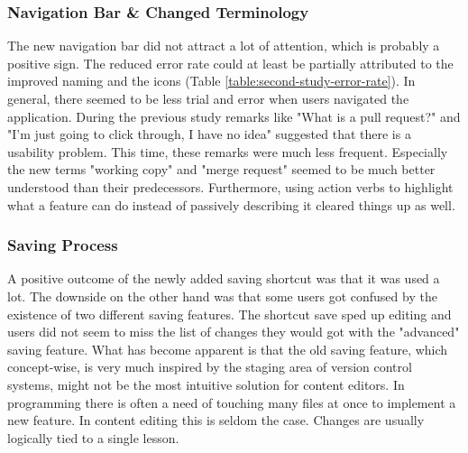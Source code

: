 \subsubsection{Navigation Bar \& Changed Terminology}
The new navigation bar did not attract a lot of attention, which is probably a positive sign. The reduced error rate could at least be partially attributed to the improved naming and the icons (Table \ref{table:second-study-error-rate}). In general, there seemed to be less trial and error when users navigated the application. During the previous study remarks like "What is a pull request?" and "I'm just going to click through, I have no idea" suggested that there is a usability problem. This time, these remarks were much less frequent. Especially the new terms "working copy" and "merge request" seemed to be much better understood than their predecessors. Furthermore, using action verbs to highlight what a feature can do instead of passively describing it cleared things up as well.



\subsubsection{Saving Process}
A positive outcome of the newly added saving shortcut was that it was used a lot. The downside on the other hand was that some users got confused by the existence of two different saving features. The shortcut save sped up editing and users did not seem to miss the list of changes they would got with the "advanced" saving feature. What has become apparent is that the old saving feature, which concept-wise, is very much inspired by the staging area of version control systems, might not be the most intuitive solution for content editors. In programming there is often a need of touching many files at once to implement a new feature. In content editing this is seldom the case. Changes are usually logically tied to a single lesson.

